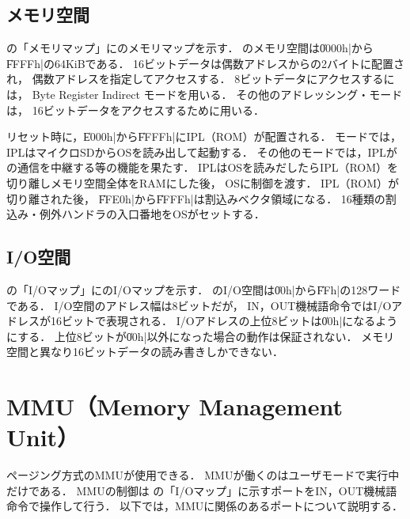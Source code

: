 \subsection{メモリ空間}
の「メモリマップ」に{\tac}のメモリマップを示す．
{\tac}のメモリ空間は\|0000h|から\|FFFFh|の64KiBである．
16ビットデータは偶数アドレスからの2バイトに配置され，
偶数アドレスを指定してアクセスする．
8ビットデータにアクセスするには，
Byte Register Indirect モードを用いる．
その他のアドレッシング・モードは，
16ビットデータをアクセスするために用いる．

リセット時に，\|E000h|から\|FFFFh|にIPL（ROM）が配置される．
{\tac}モードでは，IPLはマイクロSDからOSを読み出して起動する．
その他のモードでは，IPLが{\tec}の通信を中継する等の機能を果たす．
IPLはOSを読みだしたらIPL（ROM）を切り離しメモリ空間全体をRAMにした後，
OSに制御を渡す．
IPL（ROM）が切り離された後，
\|FFE0h|から\|FFFFh|は割込みベクタ領域になる．
16種類の割込み・例外ハンドラの入口番地をOSがセットする．

\subsection{I/O空間}
の「I/Oマップ」に{\tac}のI/Oマップを示す．
{\tac}のI/O空間は\|00h|から\|FFh|の128ワードである．
I/O空間のアドレス幅は8ビットだが，
IN，OUT機械語命令ではI/Oアドレスが16ビットで表現される．
I/Oアドレスの上位8ビットは\|00h|になるようにする．
上位8ビットが\|00h|以外になった場合の動作は保証されない．
メモリ空間と異なり16ビットデータの読み書きしかできない．

\section{MMU（Memory Management Unit）}
ページング方式のMMUが使用できる．
MMUが働くのはユーザモードで実行中だけである．
MMUの制御は
の「I/Oマップ」に示すポートをIN，OUT機械語命令で操作して行う．
以下では，MMUに関係のあるポートについて説明する．

